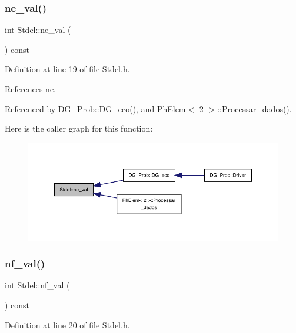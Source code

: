 \subsubsection{\texorpdfstring{ne\+\_\+val()}{ne\_val()}}
{\footnotesize\ttfamily int Stdel\+::ne\+\_\+val (\begin{DoxyParamCaption}{ }\end{DoxyParamCaption}) const\hspace{0.3cm}{\ttfamily [inline]}}



Definition at line 19 of file Stdel.\+h.



References ne.



Referenced by D\+G\+\_\+\+Prob\+::\+D\+G\+\_\+eco(), and Ph\+Elem$<$ 2 $>$\+::\+Processar\+\_\+dados().

Here is the caller graph for this function\+:
\nopagebreak
\begin{figure}[H]
\begin{center}
\leavevmode
\includegraphics[width=350pt]{classStdel_aa45f211663f5e8e47fdea32232ff23ea_icgraph}
\end{center}
\end{figure}
\mbox{\label{classStdel_a2eed3ce0b73050e868989be78d918e5c}} 
\subsubsection{\texorpdfstring{nf\+\_\+val()}{nf\_val()}}
{\footnotesize\ttfamily int Stdel\+::nf\+\_\+val (\begin{DoxyParamCaption}{ }\end{DoxyParamCaption}) const\hspace{0.3cm}{\ttfamily [inline]}}



Definition at line 20 of file Stdel.\+h.



